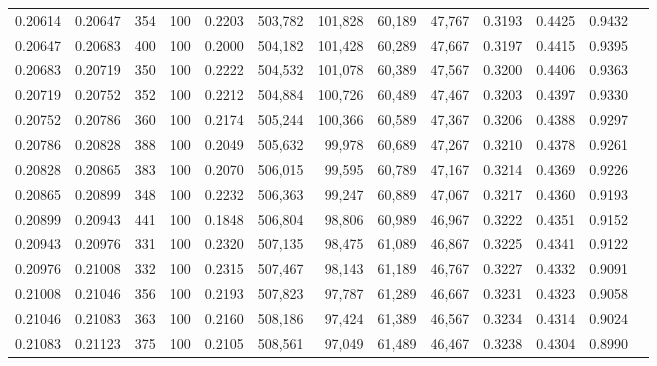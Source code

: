\begin{tabular}{rrrrrrrrrrrrr}
0.20614 & 0.20647 &   354 & 100 &                                     0.2203 & 503,782 & 101,828 &  60,189 &  47,767 & 0.3193 & 0.4425 & 0.9432 \\
0.20647 & 0.20683 &   400 & 100 &                                     0.2000 & 504,182 & 101,428 &  60,289 &  47,667 & 0.3197 & 0.4415 & 0.9395 \\
0.20683 & 0.20719 &   350 & 100 &                                     0.2222 & 504,532 & 101,078 &  60,389 &  47,567 & 0.3200 & 0.4406 & 0.9363 \\
0.20719 & 0.20752 &   352 & 100 &                                     0.2212 & 504,884 & 100,726 &  60,489 &  47,467 & 0.3203 & 0.4397 & 0.9330 \\
0.20752 & 0.20786 &   360 & 100 &                                     0.2174 & 505,244 & 100,366 &  60,589 &  47,367 & 0.3206 & 0.4388 & 0.9297 \\
0.20786 & 0.20828 &   388 & 100 &                                     0.2049 & 505,632 &  99,978 &  60,689 &  47,267 & 0.3210 & 0.4378 & 0.9261 \\
0.20828 & 0.20865 &   383 & 100 &                                     0.2070 & 506,015 &  99,595 &  60,789 &  47,167 & 0.3214 & 0.4369 & 0.9226 \\
0.20865 & 0.20899 &   348 & 100 &                                     0.2232 & 506,363 &  99,247 &  60,889 &  47,067 & 0.3217 & 0.4360 & 0.9193 \\
0.20899 & 0.20943 &   441 & 100 &                                     0.1848 & 506,804 &  98,806 &  60,989 &  46,967 & 0.3222 & 0.4351 & 0.9152 \\
0.20943 & 0.20976 &   331 & 100 &                                     0.2320 & 507,135 &  98,475 &  61,089 &  46,867 & 0.3225 & 0.4341 & 0.9122 \\
0.20976 & 0.21008 &   332 & 100 &                                     0.2315 & 507,467 &  98,143 &  61,189 &  46,767 & 0.3227 & 0.4332 & 0.9091 \\
0.21008 & 0.21046 &   356 & 100 &                                     0.2193 & 507,823 &  97,787 &  61,289 &  46,667 & 0.3231 & 0.4323 & 0.9058 \\
0.21046 & 0.21083 &   363 & 100 &                                     0.2160 & 508,186 &  97,424 &  61,389 &  46,567 & 0.3234 & 0.4314 & 0.9024 \\
0.21083 & 0.21123 &   375 & 100 &                                     0.2105 & 508,561 &  97,049 &  61,489 &  46,467 & 0.3238 & 0.4304 & 0.8990 \\

\end{tabular}

